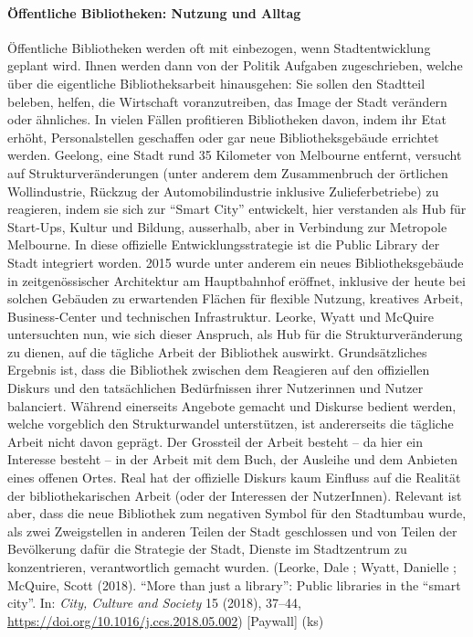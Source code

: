 \documentclass[a4paper,
fontsize=11pt,
oneside,
numbers=noperiodatend,
parskip=half-,
bibliography=totoc,
final
]{scrartcl}
\begin{document}
\hypertarget{uxf6ffentliche-bibliotheken-nutzung-und-alltag}{%
\paragraph{Öffentliche Bibliotheken: Nutzung und
Alltag}\label{uxf6ffentliche-bibliotheken-nutzung-und-alltag}}

Öffentliche Bibliotheken werden oft mit einbezogen, wenn
Stadtentwicklung geplant wird. Ihnen werden dann von der Politik
Aufgaben zugeschrieben, welche über die eigentliche Bibliotheksarbeit
hinausgehen: Sie sollen den Stadtteil beleben, helfen, die Wirtschaft
voranzutreiben, das Image der Stadt verändern oder ähnliches. In vielen
Fällen profitieren Bibliotheken davon, indem ihr Etat erhöht,
Personalstellen geschaffen oder gar neue Bibliotheksgebäude errichtet
werden. Geelong, eine Stadt rund 35 Kilometer von Melbourne entfernt,
versucht auf Strukturveränderungen (unter anderem dem Zusammenbruch der
örtlichen Wollindustrie, Rückzug der Automobilindustrie inklusive
Zulieferbetriebe) zu reagieren, indem sie sich zur \enquote{Smart City}
entwickelt, hier verstanden als Hub für Start-Ups, Kultur und Bildung,
ausserhalb, aber in Verbindung zur Metropole Melbourne. In diese
offizielle Entwicklungsstrategie ist die Public Library der Stadt
integriert worden. 2015 wurde unter anderem ein neues Bibliotheksgebäude
in zeitgenössischer Architektur am Hauptbahnhof eröffnet, inklusive der
heute bei solchen Gebäuden zu erwartenden Flächen für flexible Nutzung,
kreatives Arbeit, Business-Center und technischen Infrastruktur. Leorke,
Wyatt und McQuire untersuchten nun, wie sich dieser Anspruch, als Hub
für die Strukturveränderung zu dienen, auf die tägliche Arbeit der
Bibliothek auswirkt. Grundsätzliches Ergebnis ist, dass die Bibliothek
zwischen dem Reagieren auf den offiziellen Diskurs und den tatsächlichen
Bedürfnissen ihrer Nutzerinnen und Nutzer balanciert. Während einerseits
Angebote gemacht und Diskurse bedient werden, welche vorgeblich den
Strukturwandel unterstützen, ist andererseits die tägliche Arbeit nicht
davon geprägt. Der Grossteil der Arbeit besteht -- da hier ein Interesse
besteht -- in der Arbeit mit dem Buch, der Ausleihe und dem Anbieten
eines offenen Ortes. Real hat der offizielle Diskurs kaum Einfluss auf
die Realität der bibliothekarischen Arbeit (oder der Interessen der
NutzerInnen). Relevant ist aber, dass die neue Bibliothek zum negativen
Symbol für den Stadtumbau wurde, als zwei Zweigstellen in anderen Teilen
der Stadt geschlossen und von Teilen der Bevölkerung dafür die Strategie
der Stadt, Dienste im Stadtzentrum zu konzentrieren, verantwortlich
gemacht wurden. (Leorke, Dale ; Wyatt, Danielle ; McQuire, Scott (2018).
\enquote{More than just a library}: Public libraries in the
\enquote{smart city}. In: \emph{City, Culture and Society} 15 (2018),
37--44, \url{https://doi.org/10.1016/j.ccs.2018.05.002}) {[}Paywall{]}
(ks)
\end{document}
